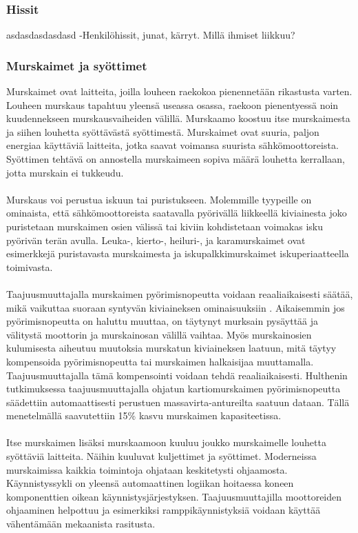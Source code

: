 \documentclass[finnish,12pt,a4paper,pdftex,elec,utf8]{aaltothesis}
\begin{document}
\subsubsection{Hissit}
asdasdasdasdasd
-Henkilöhissit, junat, kärryt. Millä ihmiset liikkuu?

\subsubsection{Murskaimet ja syöttimet} %
Murskaimet ovat laitteita, joilla louheen raekokoa pienennetään rikastusta varten. Louheen murskaus tapahtuu yleensä useassa osassa, raekoon pienentyessä noin kuudennekseen murskausvaiheiden välillä. Murskaamo koostuu itse murskaimesta ja siihen louhetta syöttävästä syöttimestä. Murskaimet ovat suuria, paljon energiaa käyttäviä laitteita, jotka saavat voimansa suurista sähkömoottoreista. Syöttimen tehtävä on annostella murskaimeen sopiva määrä louhetta kerrallaan, jotta murskain ei tukkeudu.
\\\\
Murskaus voi perustua iskuun tai puristukseen. Molemmille tyypeille on ominaista, että sähkömoottoreista saatavalla pyörivällä liikkeellä kiviainesta joko puristetaan murskaimen osien välissä tai kiviin kohdistetaan voimakas isku pyörivän terän avulla. Leuka-, kierto-, heiluri-, ja karamurskaimet ovat esimerkkejä puristavasta murskaimesta ja iskupalkkimurskaimet iskuperiaatteella toimivasta.
\\\\
Taajuusmuuttajalla murskaimen pyörimisnopeutta voidaan reaaliaikaisesti säätää, mikä vaikuttaa suoraan syntyvän kiviaineksen ominaisuuksiin \cite{Hulthen}. Aikaisemmin jos pyörimisnopeutta on haluttu muuttaa, on täytynyt murksain pysäyttää ja välitystä moottorin ja murskainosan välillä vaihtaa. Myös murskainosien kulumisesta aiheutuu muutoksia murskatun kiviaineksen laatuun, mitä täytyy kompensoida pyörimisnopeutta tai murskaimen halkaisijaa muuttamalla. Taajuusmuuttajalla tämä kompensointi voidaan tehdä reaaliaikaisesti. Hulthenin tutkimuksessa \cite{Hulthen} taajuusmuuttajalla ohjatun kartiomurskaimen pyörimisnopeutta säädettiin automaattisesti perustuen massavirta-antureilta saatuun dataan. Tällä menetelmällä saavutettiin 15\% kasvu murskaimen kapasiteetissa.
\\\\
Itse murskaimen lisäksi murskaamoon kuuluu joukko murskaimelle louhetta syöttäviä laitteita. Näihin kuuluvat kuljettimet ja syöttimet. Moderneissa murskaimissa kaikkia toimintoja ohjataan keskitetysti ohjaamosta. Käynnistyssykli on yleensä automaattinen logiikan hoitaessa koneen komponenttien oikean käynnistysjärjestyksen. Taajuusmuuttajilla moottoreiden ohjaaminen helpottuu ja esimerkiksi ramppikäynnistyksiä voidaan käyttää vähentämään mekaanista rasitusta.
\end{document}
